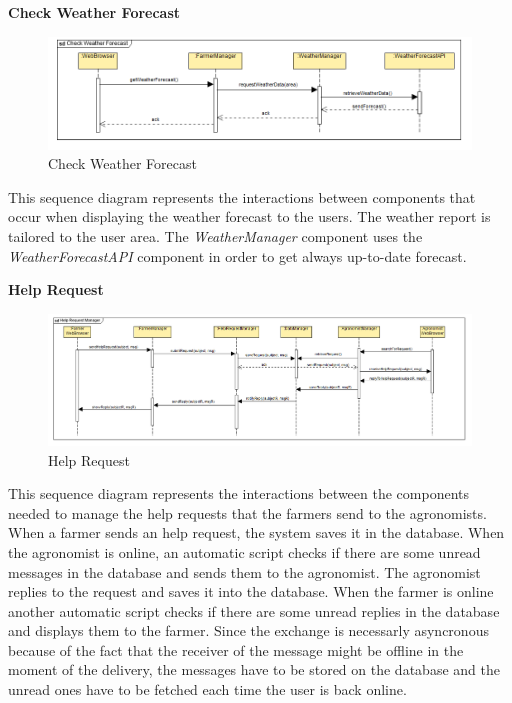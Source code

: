 \documentclass[table, 12pt]{article}
\begin{document}
\newpage
\textbf{Check Weather Forecast}
\begin{center}
    \begin{figure}[H]
        \includegraphics[scale=0.6, center]{assets/SequenceDiagram/CheckWeatherForecast.png}
        \caption{Check Weather Forecast}
        \label{fig: forecast}
    \end{figure}
\end{center}
This sequence diagram represents the interactions between components that occur when displaying the weather forecast to the users. The weather report is tailored to the user area.
The \textit{WeatherManager} component uses the \textit{WeatherForecastAPI} component in order to get always up-to-date forecast.

\newpage
\textbf{Help Request}
\begin{center}
    \begin{figure}[H]
        \includegraphics[scale=0.5, center]{assets/SequenceDiagram/HelpRequestManager.png}
        \caption{Help Request}
        \label{fig: helpRequest}
    \end{figure}
\end{center}
This sequence diagram represents the interactions between the components needed to manage the help requests that the farmers send to the agronomists.
When a farmer sends an help request, the system saves it in the database.
When the agronomist is online, an automatic script checks if there are some unread messages in the database and sends them to the agronomist.
The agronomist replies to the request and saves it into the database. 
When the farmer is online another automatic script checks if there are some unread replies in the database and displays them to the farmer.
Since the exchange is necessarly asyncronous because of the fact that the receiver of the message might be offline in the moment of the delivery, the messages have to be stored on the database and the unread ones have to be fetched each time the user is back online.   
\end{document}
